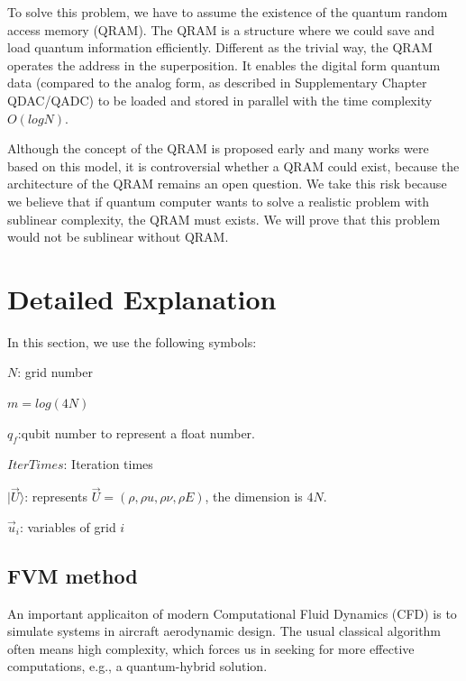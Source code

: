 \documentclass[%
 reprint,
 amsmath,amssymb,
pra,
]{revtex4-1}
\begin{document}
To solve this problem, we have to assume the existence of the quantum random access memory (QRAM). The QRAM is a structure where we could save and load quantum information efficiently. Different as the trivial way, the QRAM operates the address in the superposition. It enables the digital form quantum data (compared to the analog form, as described in Supplementary Chapter QDAC/QADC) to be loaded and stored in parallel with the time complexity $O(log N)$.

Although the concept of the QRAM is proposed early and many works were based on this model, it is controversial whether a QRAM could exist, because the architecture of the QRAM remains an open question. We take this risk because we believe that if quantum computer wants to solve a realistic problem with sublinear complexity, the QRAM must exists. We will prove that this problem would not be sublinear without QRAM.






\section{Detailed Explanation}\label{detail}
In this section, we use the following symbols:

$N$: grid number

$m=log(4N)$

$q_f$:qubit number to represent a float number.

$IterTimes$: Iteration times

$|\vec{U}\rangle$: represents $\vec{U}=(\rho,\rho u, \rho\nu, \rho E)$, the dimension is $4N$. 

$\vec{u}_i$: variables of grid $i$ 

\subsection{FVM method}\label{classicalFVM}

An important applicaiton of modern Computational Fluid Dynamics (CFD) is to simulate systems in aircraft aerodynamic design. The usual classical algorithm often means high complexity, which forces us in seeking for more effective computations, e.g., a quantum-hybrid solution.
\end{document}
